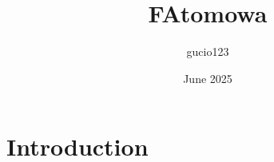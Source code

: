\documentclass{article}
\title{FAtomowa}
\author{gucio123 }
\date{June 2025}
\begin{document}
\maketitle

\section{Introduction}
\end{document}
